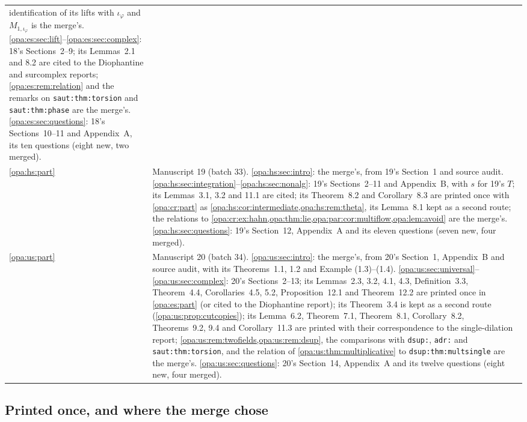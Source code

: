 \documentclass[11pt,oneside]{article}
\numberwithin{equation}{section}
\theoremstyle{definition}
\theoremstyle{remark}
\newcommand{\lbl}[1]{\nolinkurl{#1}}
\begin{document}
\begin{center}
\begin{longtable}{>{\raggedright\arraybackslash}p{}>{\raggedright\arraybackslash}p{}}
identification of its lifts with $\iota_\varphi$ and $M_{1,\iota_\varphi}$ is the merge's. \ref{opa:es:sec:lift}--\ref{opa:es:sec:complex}: 18's
Sections~2--9; its Lemmas~2.1 and 8.2 are cited to the Diophantine and surcomplex reports; \cref{opa:es:rem:relation} and the remarks
on \lbl{saut:thm:torsion} and \lbl{saut:thm:phase} are the merge's. \ref{opa:es:sec:questions}: 18's Sections~10--11 and Appendix~A,
its ten questions (eight new, two merged).\\
\cref{opa:hs:part} & Manuscript 19 (batch 33). \ref{opa:hs:sec:intro}: the merge's, from 19's Section~1 and source audit.
\ref{opa:hs:sec:integration}--\ref{opa:hs:sec:nonalg}: 19's Sections~2--11 and Appendix~B, with $s$ for 19's $T$; its Lemmas~3.1, 3.2 and
11.1 are cited; its Theorem~8.2 and Corollary~8.3 are printed once with \cref{opa:cr:part} as \cref{opa:hs:cor:intermediate,opa:hs:rem:theta},
its Lemma~8.1 kept as a second route; the relations to \cref{opa:cr:ex:hahn,opa:thm:lie,opa:par:cor:multiflow,opa:lem:avoid} are the
merge's. \ref{opa:hs:sec:questions}: 19's Section~12, Appendix~A and its eleven questions (seven new, four merged).\\
\cref{opa:us:part} & Manuscript 20 (batch 34). \ref{opa:us:sec:intro}: the merge's, from 20's Section~1, Appendix~B and source audit, with
its Theorems~1.1, 1.2 and Example (1.3)--(1.4). \ref{opa:us:sec:universal}--\ref{opa:us:sec:complex}: 20's Sections~2--13; its Lemmas~2.3, 3.2,
4.1, 4.3, Definition~3.3, Theorem~4.4, Corollaries~4.5, 5.2, Proposition~12.1 and Theorem~12.2 are printed once in \cref{opa:es:part} (or cited to
the Diophantine report); its Theorem~3.4 is kept as a second route (\cref{opa:us:prop:cutcopies}); its Lemma~6.2, Theorem~7.1, Theorem~8.1,
Corollary~8.2, Theorems~9.2, 9.4 and Corollary~11.3 are printed with their correspondence to the single-dilation report;
\cref{opa:us:rem:twofields,opa:us:rem:dsup}, the comparisons with \lbl{dsup:}, \lbl{adr:} and \lbl{saut:thm:torsion}, and the relation of
\cref{opa:us:thm:multiplicative} to \lbl{dsup:thm:multsingle} are the merge's. \ref{opa:us:sec:questions}: 20's Section~14, Appendix~A and its twelve
questions (eight new, four merged).\\
\bottomrule
\end{longtable}
\end{center}

\subsection{Printed once, and where the merge chose}
\end{document}
